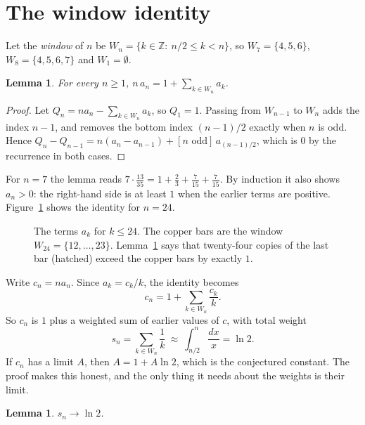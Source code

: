 \documentclass[11pt]{amsart}
\newtheorem{lemma}[theorem]{Lemma}
\theoremstyle{remark}
\begin{document}
\section{The window identity}

Let the \emph{window} of $n$ be $W_n=\{k\in\mathbb Z:\ n/2\le k<n\}$, so $W_7=\{4,5,6\}$, $W_8=\{4,5,6,7\}$ and $W_1=\emptyset$.

\begin{lemma}\label{lem:window}
For every $n\ge1$, $\displaystyle n\,a_n=1+\sum_{k\in W_n}a_k$.
\end{lemma}

\begin{proof}
Let $Q_n=na_n-\sum_{k\in W_n}a_k$, so $Q_1=1$. Passing from $W_{n-1}$ to $W_n$ adds the index $n-1$, and removes the bottom index $(n-1)/2$ exactly when $n$ is odd. Hence $Q_n-Q_{n-1}=n(a_n-a_{n-1})+[n\text{ odd}]\,a_{(n-1)/2}$, which is $0$ by the recurrence in both cases.
\end{proof}

For $n=7$ the lemma reads $7\cdot\tfrac{13}{35}=1+\tfrac23+\tfrac7{15}+\tfrac7{15}$. By induction it also shows $a_n>0$: the right-hand side is at least $1$ when the earlier terms are positive. Figure~\ref{fig:window24} shows the identity for $n=24$.

\begin{figure}[ht]
\centering
\begin{tikzpicture}
  
\end{tikzpicture}
\caption{The terms $a_k$ for $k\le24$. The copper bars are the window $W_{24}=\{12,\dots,23\}$. Lemma~\ref{lem:window} says that twenty-four copies of the last bar (hatched) exceed the copper bars by exactly $1$.}
\label{fig:window24}
\end{figure}

Write $c_n=na_n$. Since $a_k=c_k/k$, the identity becomes
\begin{equation}\label{eq:c}
c_n=1+\sum_{k\in W_n}\frac{c_k}{k}.
\end{equation}
So $c_n$ is $1$ plus a weighted sum of earlier values of $c$, with total weight
\[
s_n=\sum_{k\in W_n}\frac1k\ \approx\ \int_{n/2}^{n}\frac{dx}{x}=\ln 2 .
\]
If $c_n$ has a limit $A$, then $A=1+A\ln2$, which is the conjectured constant. The proof makes this honest, and the only thing it needs about the weights is their limit.

\begin{lemma}\label{lem:weights}
$s_n\to\ln2$.
\end{lemma}
\end{document}
